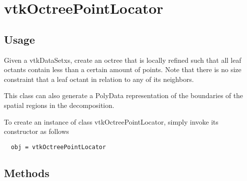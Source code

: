 \section{vtkOctreePointLocator}

\subsection{Usage}

     Given a vtkDataSetxs, create an octree that is locally refined
     such that all leaf octants contain less than a certain 
     amount of points.  Note that there is no size constraint that
     a leaf octant in relation to any of its neighbors.

     This class can also generate a PolyData representation of
     the boundaries of the spatial regions in the decomposition.


To create an instance of class vtkOctreePointLocator, simply
invoke its constructor as follows
\begin{verbatim}
  obj = vtkOctreePointLocator
\end{verbatim}
\subsection{Methods}

